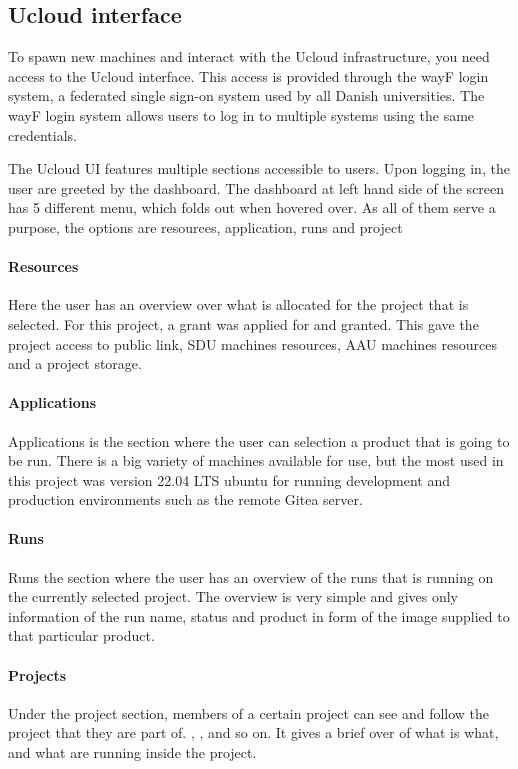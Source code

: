 \subsection{Ucloud interface}
\label{sec:ucloud-interface}
To spawn new machines and interact with the Ucloud infrastructure, you need access to the \ac{Ucloud} interface. 
This access is provided through the wayF login system, a federated single sign-on system used by all Danish universities. 
The wayF login system allows users to log in to multiple systems using the same credentials.

The \ac{Ucloud} UI features multiple sections accessible to users. Upon logging in, the user are greeted by the dashboard.
The dashboard at left hand side of the screen has 5 different menu, which folds out when hovered over. 
As all of them serve a purpose, the options are resources, application, runs and project

\paragraph{Resources}
Here the user has an overview over what is allocated for the project that is selected.
For this project, a grant was applied for and granted. This gave the project access to 
public link, SDU machines resources, AAU machines resources and a project storage.

\paragraph{Applications}
Applications is the section where the user can selection a product that is going to be run.
There is a big variety of machines available for use, but the most used in this project was 
version 22.04 LTS ubuntu for running development and production environments such as the remote Gitea server.

\paragraph{Runs}
Runs the section where the user has an overview of the runs that is running on the currently selected project.
The overview is very simple and gives only information of the run name, status and product in form of the image 
supplied to that particular product.

\paragraph{Projects}
Under the project section, members of a certain project can see and follow the project that they are part of.
, ,  and so on. It gives a brief over of what is what,
and what are running inside the project.